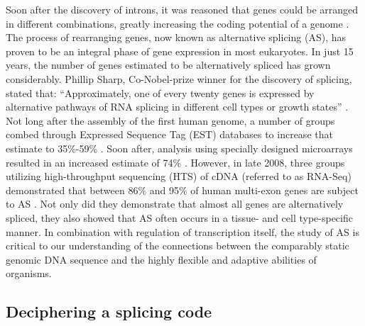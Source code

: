Soon after the discovery of introns, it was reasoned that genes could be arranged in different combinations, greatly increasing the coding potential of a genome \citep{Gilbert1978a}. The process of rearranging genes, now known as alternative splicing (AS), has proven to be an integral phase of gene expression in most eukaryotes. In just 15 years, the number of genes estimated to be alternatively spliced has grown considerably. Phillip Sharp, Co-Nobel-prize winner for the discovery of splicing, stated that: “Approximately, one of every twenty genes is expressed by alternative pathways of RNA splicing in different cell types or growth states” \cite{Sharp2014}. Not long after the assembly of the first human genome, a number of groups combed through Expressed Sequence Tag (EST) databases to increase that estimate to 35\%-59\% \citep{Modrek2002}. Soon after, analysis using specially designed microarrays resulted in an increased estimate of 74\% \citep{Johnson2003}. However, in late 2008, three groups utilizing high-throughput sequencing (HTS) of cDNA (referred to as RNA-Seq) demonstrated that between 86\% and 95\% of human multi-exon genes are subject to AS \citep{Pan2008, Wang2008, Sultan2008}. Not only did they demonstrate that almost all genes are alternatively spliced, they also showed that AS often occurs in a tissue- and cell type-specific manner. In combination with regulation of transcription itself, the study of AS is critical to our understanding of the connections between the comparably static genomic DNA sequence and the highly flexible and adaptive abilities of organisms.

\subsection{Deciphering a splicing code}

